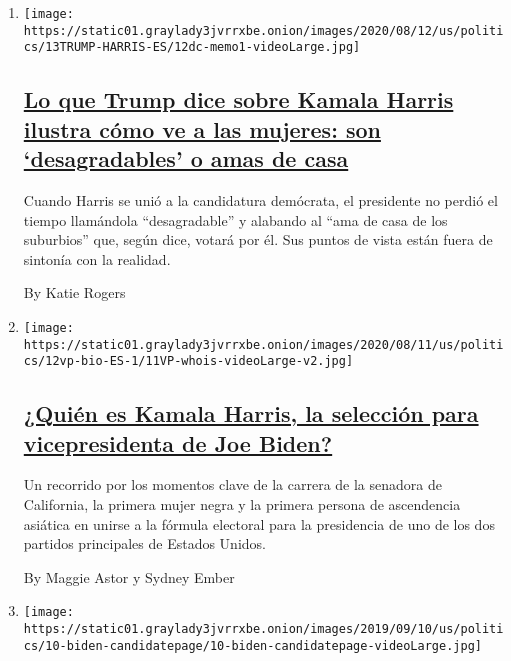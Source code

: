 \begin{enumerate}
\def\labelenumi{\arabic{enumi}.}
\item
  \texttt{[image: https://static01.graylady3jvrrxbe.onion/images/2020/08/12/us/politics/13TRUMP-HARRIS-ES/12dc-memo1-videoLarge.jpg]}

  \hypertarget{lo-que-trump-dice-sobre-kamala-harris-ilustra-cuxf3mo-ve-a-las-mujeres-son-desagradables-o-amas-de-casa}{%
  \subsection{\texorpdfstring{\href{/es/2020/08/14/espanol/mundo/trump-kamala-harris.html}{Lo
  que Trump dice sobre Kamala Harris ilustra cómo ve a las mujeres: son
  `desagradables' o amas de
  casa}}{Lo que Trump dice sobre Kamala Harris ilustra cómo ve a las mujeres: son `desagradables' o amas de casa}}\label{lo-que-trump-dice-sobre-kamala-harris-ilustra-cuxf3mo-ve-a-las-mujeres-son-desagradables-o-amas-de-casa}}

  Cuando Harris se unió a la candidatura demócrata, el presidente no
  perdió el tiempo llamándola ``desagradable'' y alabando al ``ama de
  casa de los suburbios'' que, según dice, votará por él. Sus puntos de
  vista están fuera de sintonía con la realidad.

  By Katie Rogers
\item
  \texttt{[image: https://static01.graylady3jvrrxbe.onion/images/2020/08/11/us/politics/12vp-bio-ES-1/11VP-whois-videoLarge-v2.jpg]}

  \hypertarget{quiuxe9n-es-kamala-harris-la-selecciuxf3n-para-vicepresidenta-de-joe-biden}{%
  \subsection{\texorpdfstring{\href{/es/2020/08/12/espanol/estados-unidos/quien-es-kamala-harris-vicepresidenta.html}{¿Quién
  es Kamala Harris, la selección para vicepresidenta de Joe
  Biden?}}{¿Quién es Kamala Harris, la selección para vicepresidenta de Joe Biden?}}\label{quiuxe9n-es-kamala-harris-la-selecciuxf3n-para-vicepresidenta-de-joe-biden}}

  Un recorrido por los momentos clave de la carrera de la senadora de
  California, la primera mujer negra y la primera persona de ascendencia
  asiática en unirse a la fórmula electoral para la presidencia de uno
  de los dos partidos principales de Estados Unidos.

  By Maggie Astor y Sydney Ember
\item
  \texttt{[image: https://static01.graylady3jvrrxbe.onion/images/2019/09/10/us/politics/10-biden-candidatepage/10-biden-candidatepage-videoLarge.jpg]}


\end{enumerate}
